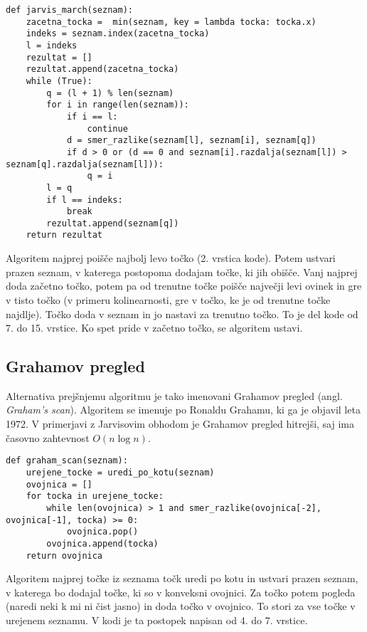 \documentclass[a4paper]{article}
\begin{document}
\begin{lstlisting}
def jarvis_march(seznam):
    zacetna_tocka =  min(seznam, key = lambda tocka: tocka.x)
    indeks = seznam.index(zacetna_tocka)
    l = indeks
    rezultat = []
    rezultat.append(zacetna_tocka)
    while (True):
        q = (l + 1) % len(seznam)
        for i in range(len(seznam)):
            if i == l:
                continue
            d = smer_razlike(seznam[l], seznam[i], seznam[q])
            if d > 0 or (d == 0 and seznam[i].razdalja(seznam[l]) > seznam[q].razdalja(seznam[l])):
                q = i
        l = q
        if l == indeks:
            break 
        rezultat.append(seznam[q])
    return rezultat
\end{lstlisting}

Algoritem najprej poišče najbolj levo točko (2. vrstica kode). Potem ustvari prazen seznam, v katerega postopoma dodajam točke, ki jih obišče. Vanj najprej doda začetno točko,
potem pa od trenutne točke poišče največji levi ovinek in gre v tisto točko (v primeru kolinearnosti, gre v točko, ke je od trenutne točke najdlje). Točko doda v seznam 
in jo nastavi za trenutno točko. To je del kode od 7. do 15. vrstice. Ko spet pride v začetno točko, se algoritem ustavi.


\subsection{Grahamov pregled}
Alternativa prejšnjemu algoritmu je tako imenovani Grahamov pregled (angl. \textit{Graham's scan}). Algoritem se imenuje po Ronaldu Grahamu, ki ga je objavil leta 1972. 
V primerjavi z Jarvisovim obhodom je Grahamov pregled hitrejši, saj ima časovno zahtevnost $O(n \log n)$.

\begin{lstlisting}
def graham_scan(seznam):
    urejene_tocke = uredi_po_kotu(seznam)
    ovojnica = []
    for tocka in urejene_tocke:
        while len(ovojnica) > 1 and smer_razlike(ovojnica[-2], ovojnica[-1], tocka) >= 0:  
            ovojnica.pop()
        ovojnica.append(tocka)
    return ovojnica
\end{lstlisting}
\newpage
Algoritem najprej točke iz seznama točk uredi po kotu in ustvari prazen seznam, v katerega bo dodajal točke, ki so v konveksni ovojnici. Za točko potem pogleda (naredi neki k mi ni čist
jasno) in doda točko v ovojnico. To stori za vse točke v urejenem seznamu. V kodi je ta postopek napisan od 4. do 7. vrstice.
\end{document}
